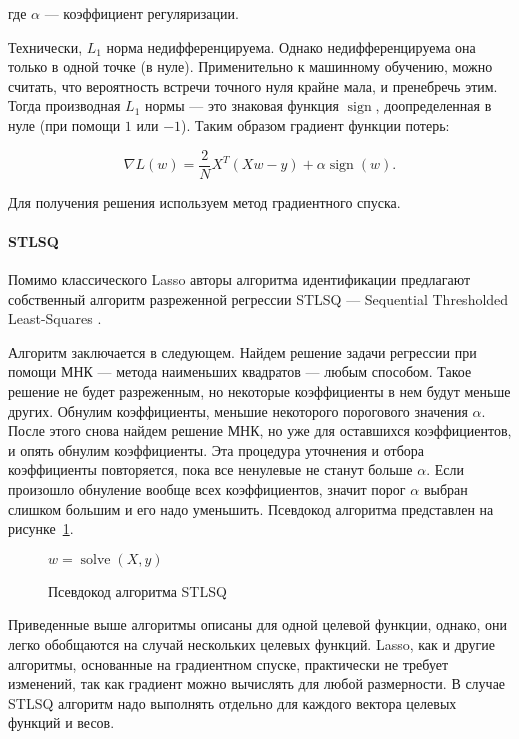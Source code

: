 где $\alpha$ --- коэффициент регуляризации.

Технически, $L_1$ норма недифференцируема. Однако недифференцируема она только в одной точке (в нуле). Применительно к машинному обучению, можно считать, что вероятность встречи точного нуля крайне мала, и пренебречь этим. Тогда производная $L_1$ нормы --- это знаковая функция $\operatorname{sign}$, доопределенная в нуле (при помощи $1$ или $-1$). Таким образом градиент функции потерь:

\begin{equation}
\nabla L(w) = \frac{2}{N} X^T (X w - y) + \alpha \operatorname{sign}(w).
\end{equation}

Для получения решения используем метод градиентного спуска.

\paragraph{STLSQ}

Помимо классического Lasso авторы алгоритма идентификации предлагают собственный алгоритм разреженной регрессии STLSQ --- Sequential Thresholded Least-Squares \cite{sindy}.

Алгоритм заключается в следующем. Найдем решение задачи регрессии при помощи МНК --- метода наименьших квадратов --- любым способом. Такое решение не будет разреженным, но некоторые коэффициенты в нем будут меньше других. Обнулим коэффициенты, меньшие некоторого порогового значения $\alpha$. После этого снова найдем решение МНК, но уже для оставшихся коэффициентов, и опять обнулим коэффициенты. Эта процедура уточнения и отбора коэффициенты повторяется, пока все ненулевые не станут больше $\alpha$. Если произошло обнуление вообще всех коэффициентов, значит порог $\alpha$ выбран слишком большим и его надо уменьшить. Псевдокод алгоритма представлен на рисунке~\ref{alg:stlsq}.

\begin{figure}
\begin{minipage}{\linewidth}
\begin{algorithm}[H]
\SetAlgoVlined
{}

$w = \operatorname{solve}(X, y)$ 
\end{algorithm}
\end{minipage}
\caption{Псевдокод алгоритма STLSQ}
\label{alg:stlsq}
\end{figure}

Приведенные выше алгоритмы описаны для одной целевой функции, однако, они легко обобщаются на случай нескольких целевых функций. Lasso, как и другие алгоритмы, основанные на градиентном спуске, практически не требует изменений, так как градиент можно вычислять для любой размерности. В случае STLSQ алгоритм надо выполнять отдельно для каждого вектора целевых функций и весов.